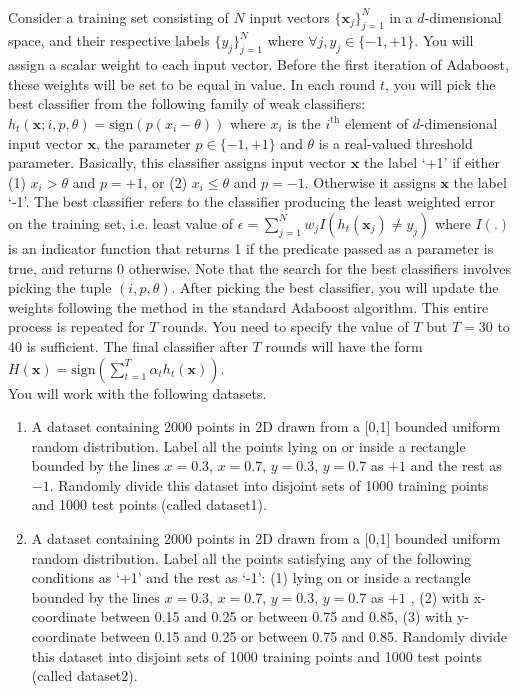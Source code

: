 \documentclass[11pt]{article}
\begin{document}
\begin{enumerate}
\\
Consider a training set consisting of $N$ input vectors $\{\textbf{x}_j\}_{j=1}^{N}$ in a $d$-dimensional space, and their respective labels $\{y_j\}_{j=1}^N$ where $\forall j, y_j \in \{-1,+1\}$. You will assign a scalar weight to each input vector. Before the first iteration of Adaboost, these weights will be set to be equal in value. In each round $t$, you will pick the best classifier from the following family of weak classifiers: $h_t(\textbf{x}; i,p,\theta) = \textrm{sign}(p(x_i - \theta))$ where $x_i$ is the $i^{\textrm{th}}$ element of $d$-dimensional input vector $\textbf{x}$, the parameter $p \in \{-1,+1\}$ and $\theta$ is a real-valued threshold parameter. Basically, this classifier assigns input vector $\textbf{x}$ the label `+1' if either (1) $x_i > \theta$ and $p = +1$, or (2) $x_i \leq \theta$ and $p=-1$. Otherwise it assigns $\textbf{x}$ the label `-1'. The best classifier refers to the classifier producing the least weighted error on the training set, i.e. least value of $\epsilon = \sum_{j=1}^N w_j I(h_t(\textbf{x}_j) \neq y_j)$ where $I(.)$ is an indicator function that returns 1 if the predicate passed as a parameter is true, and returns 0 otherwise. Note that the search for the best classifiers involves picking the tuple $(i,p,\theta)$. After picking the best classifier, you will update the weights following the method in the standard Adaboost algorithm. This entire process is repeated for $T$ rounds. You need to specify the value of $T$ but $T = 30$ to $40$ is sufficient. The final classifier after $T$ rounds will have the form $H(\textbf{x}) = \textrm{sign}(\sum_{t=1}^{T} \alpha_t h_t(\textbf{x}))$. 
\\
You will work with the following datasets. 
\begin{enumerate}
\item A dataset containing 2000 points in 2D drawn from a [0,1] bounded uniform random distribution. Label all the points lying on or inside a rectangle bounded by the lines $x = 0.3$, $x = 0.7$, $y = 0.3$, $y= 0.7$ as $+1$ and the rest as $-1$. Randomly divide this dataset into disjoint sets of 1000 training points and 1000 test points (called dataset1). 

\item A dataset containing 2000 points in 2D drawn from a [0,1] bounded uniform random distribution. Label all the points satisfying any of the following conditions as `+1' and the rest as `-1': (1) lying on or inside a rectangle bounded by the lines $x = 0.3$, $x = 0.7$, $y = 0.3$, $y= 0.7$ as $+1$ , (2) with x-coordinate between 0.15 and 0.25 or between 0.75 and 0.85, (3) with y-coordinate between 0.15 and 0.25 or between 0.75 and 0.85. Randomly divide this dataset into disjoint sets of 1000 training points and 1000 test points (called dataset2). 


\end{enumerate}
\end{enumerate}
\end{document}
